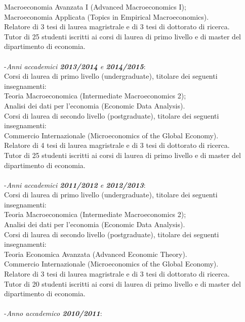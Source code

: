 \documentclass[10p]{article}
\begin{document}
Macroeconomia Avanzata I (Advanced Macroeconomics I);\\
Macroeconomia Applicata (Topics in Empirical Macroeconomics).\\
Relatore di 3 tesi di laurea magristrale e di 3 tesi di dottorato di ricerca.\\
Tutor di 25 studenti iscritti ai corsi di laurea di primo livello e di master del dipartimento di economia.\\
\\
-\emph{Anni accademici \textbf{2013/2014} e \textbf{2014/2015}}: \\
Corsi di laurea di primo livello (undergraduate), titolare dei seguenti insegnamenti: \\
Teoria Macroeconomica (Intermediate Macroeconomics 2); \\
Analisi dei dati per l'economia (Economic Data Analysis).\\
Corsi di laurea di secondo livello (postgraduate), titolare dei seguenti insegnamenti: \\
Commercio Internazionale (Microeconomics of the Global Economy).\\
Relatore di 4 tesi di laurea magristrale e di 3  tesi di dottorato di ricerca.\\
Tutor di 25 studenti iscritti ai corsi di laurea di primo livello e di master del dipartimento di economia.\\
\\
-\emph{Anni accademici \textbf{2011/2012} e \textbf{2012/2013}}: \\
Corsi di laurea di primo livello (undergraduate), titolare dei seguenti insegnamenti: \\
Teoria Macroeconomica (Intermediate Macroeconomics 2); \\
Analisi dei dati per l'economia (Economic Data Analysis).\\
Corsi di laurea di secondo livello (postgraduate), titolare dei seguenti insegnamenti: \\
Teoria Economica Avanzata (Advanced Economic Theory).\\
Commercio Internazionale (Microeconomics of the Global Economy). \\
Relatore di 3 tesi di laurea magristrale e di 3 tesi di dottorato di ricerca.\\
Tutor di 20 studenti iscritti ai corsi di laurea di primo livello e di master del dipartimento di economia.\\
\\
-\emph{Anno accademico \textbf{2010/2011}}: \\
\end{document}
